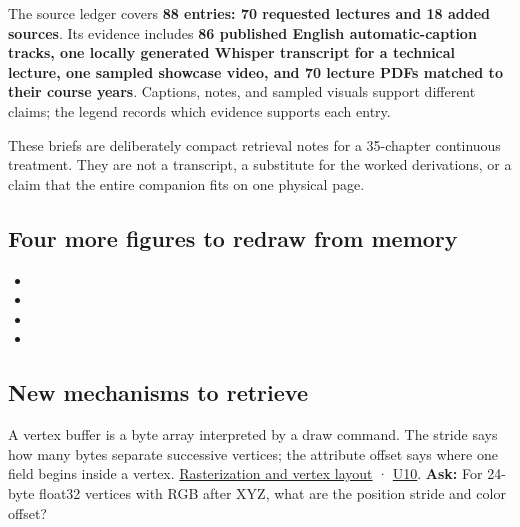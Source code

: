 The source ledger covers \textbf{88 entries: 70 requested lectures and 18 added sources}. Its evidence includes \textbf{86 published English automatic-caption tracks, one locally generated Whisper transcript for a technical lecture, one sampled showcase video, and 70 lecture PDFs matched to their course years}. Captions, notes, and sampled visuals support different claims; the legend records which evidence supports each entry.

These briefs are deliberately compact retrieval notes for a 35-chapter continuous treatment. They are not a transcript, a substitute for the worked derivations, or a claim that the entire companion fits on one physical page.

\subsection{Four more figures to redraw from memory}\label{four-more-figures-to-redraw-from-memory}

\begin{itemize}
\tightlist
\item
\item
\item
\item
\end{itemize}

\subsection{New mechanisms to retrieve}\label{new-mechanisms-to-retrieve}

A vertex buffer is a byte array interpreted by a draw command. The stride says how many bytes separate successive vertices; the attribute offset says where one field begins inside a vertex. \href{Continuous\%20Notes/University\%20-\%20Worlds,\%20Images\%20and\%20Inference\%20-\%20Graphics,\%20Vision\%20and\%20Photography\#Rasterization,\%20coverage,\%20and\%20depth}{Rasterization and vertex layout} · \href{Continuous\%20Notes/University\%20-\%20Worlds,\%20Images\%20and\%20Inference\%20-\%20Graphics,\%20Vision\%20and\%20Photography\#Figure\%20U10\%20-\%20Vertex\%20fetch\%20uses\%20a\%20stride\%20and\%20byte\%20offset}{U10}. \textbf{Ask:} For 24-byte float32 vertices with RGB after XYZ, what are the position stride and color offset?

